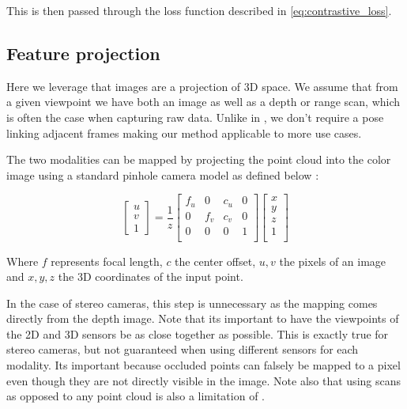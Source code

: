 \documentclass[10pt,twocolumn,letterpaper]{article}
\newcommand{\AJ}[1]{{\color{red}{[Andrej: #1]}}}
\begin{document}
This is then passed through the loss function described in \ref{eq:contrastive_loss}.

\AJ{Add figure of what your feature extractor looks like}

\AJ{Need to review how I do this in the code, I think I use a projector left over from BYOL}

\subsection{Feature projection}
\label{sec:featureProjection}

Here we leverage that images are a projection of 3D space. We assume that from a given viewpoint we have both an image as well as a depth or range scan, which is often the case when capturing raw data. Unlike in \cite{xie2020pointcontrast}, we don't require a pose linking adjacent frames making our method applicable to more use cases.

The two modalities can be mapped by projecting the point cloud into the color image using a standard pinhole camera model as defined below \cite{?}:

\begin{equation}
    \begin{bmatrix}
        u \\
        v \\
        1
    \end{bmatrix} = \frac{1}{z}
    \begin{bmatrix}
        f_u & 0   & c_u & 0 \\
        0   & f_v & c_v & 0 \\
        0   & 0   & 0   & 1 \\
    \end{bmatrix}
    \begin{bmatrix}
        x \\
        y \\
        z \\
        1 \\
    \end{bmatrix}
    \label{eq:pinhole}
\end{equation}

\AJ{Is this equation necessary or is this considered common knowledge}

Where $f$ represents focal length, $c$ the center offset, $u,v$ the pixels of an image and $x,y,z$ the 3D coordinates of the input point.

In the case of stereo cameras, this step is unnecessary as the mapping comes directly from the depth image. Note that its important to have the viewpoints of the 2D and 3D sensors be as close together as possible. This is exactly true for stereo cameras, but not guaranteed when using different sensors for each modality. Its important because occluded points can falsely be mapped to a pixel even though they are not directly visible in the image. Note also that using scans as opposed to any point cloud is also a limitation of \cite{xie2020pointcontrast}.
\end{document}
